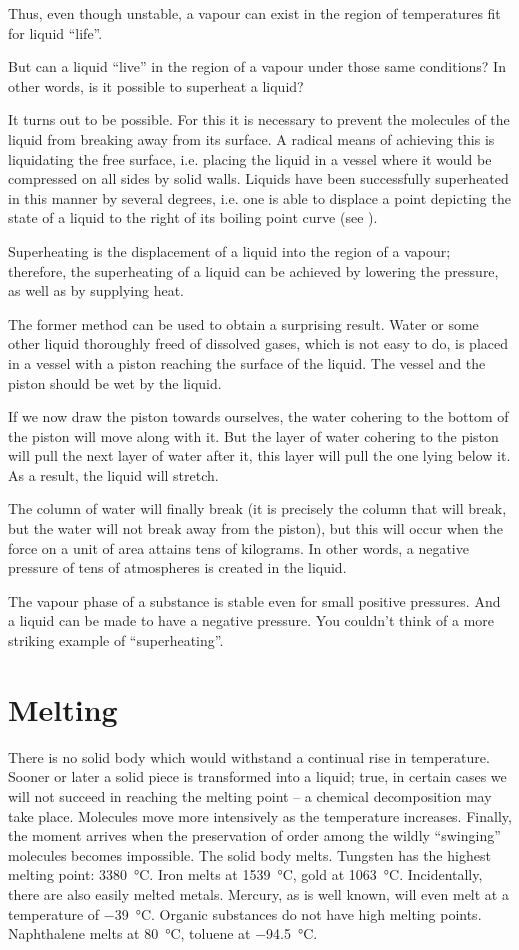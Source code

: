 Thus, even though unstable, a vapour can exist in the region of temperatures fit for liquid ``life''.

But can a liquid ``live'' in the region of a vapour under those same conditions? In other words, is it possible to superheat a liquid?

It turns out to be possible. For this it is necessary to prevent the molecules of the liquid from breaking away from its surface. A radical means of achieving this is liquidating the free surface, i.e. placing the liquid in a vessel where it would be compressed on all sides by solid walls. Liquids have been successfully superheated in this manner by several degrees, i.e. one is able to displace a point depicting the state of a liquid to the right of its boiling point curve (see ).

Superheating is the displacement of a liquid into the region of a vapour; therefore, the superheating of a liquid can be achieved by lowering the pressure, as well as by supplying heat.

The former method can be used to obtain a surprising result. Water or some other liquid thoroughly freed of dissolved gases, which is not easy to do, is placed in a vessel with a piston reaching the surface of the liquid. The vessel and the piston should be wet by the liquid.

If we now draw the piston towards ourselves, the water cohering to the bottom of the piston will move along with it. But the layer of water cohering to the piston will pull the next layer of water after it, this layer will pull the one lying below it. As a result, the liquid will stretch.

The column of water will finally break (it is precisely the column that will break, but the water will not break away from the piston), but this will occur when the force on a unit of area attains tens of kilograms. In other words, a negative pressure of tens of atmospheres is created in the liquid.

The vapour phase of a substance is stable even for small positive pressures. And a liquid can be made to have a negative pressure. You couldn’t think of a more striking example of ``superheating''.

\section{Melting}
There is no solid body which would withstand a continual rise in temperature. Sooner or later a solid piece is transformed into a liquid; true, in certain cases we will not succeed in reaching the melting point -- a chem­ical decomposition may take place.
Molecules move more intensively as the temperature increases. Finally, the moment arrives when the preservation of order among the wildly ``swinging'' mole­cules becomes impossible. The solid body melts. Tungsten has the highest melting point: \SI{3380}{\celsius}. Iron melts at \SI{1539}{\celsius}, gold at \SI{1063}{\celsius}. Incidentally, there are also easily melted metals. Mercury, as is well known, will even melt at a temperature of \SI{-39}{\celsius}. Organic substances do not have high melting points. Naphthalene melts at \SI{80}{\celsius}, toluene at \SI{-94.5}{\celsius}.
 
